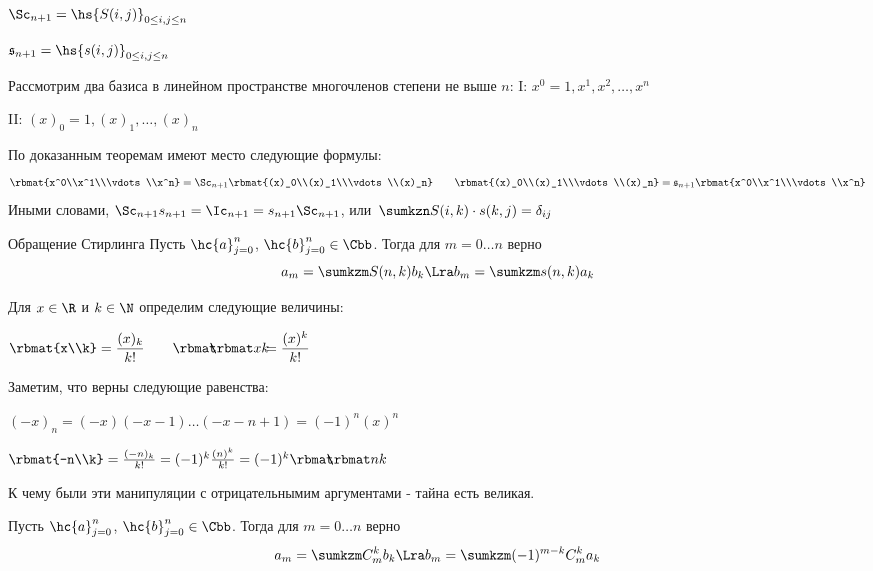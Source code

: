 \documentclass[unicode,10pt]{article}
\begin{document}
\begin{denote}
  $\displaystyle \Sc_{n+1}=\hs{S(i,j)}_{0\le i,j \le n}$\par
  $\mathfrak{s}_{n+1} = \hs{s(i,j)}_{0\le i,j \le n}$
\end{denote}
Рассмотрим два базиса в линейном пространстве многочленов степени не выше $n$:
I: $\displaystyle x^0=1, x^1, x^2, \dots, x^n$ \par
II: $\displaystyle (x)_0=1, (x)_1,\dots, (x)_n$ \par
По доказанным теоремам имеют место следующие формулы:
\begin{displaymath}
  \rbmat{x^0\\x^1\\\vdots\\x^n} = \Sc_{n+1}\rbmat{(x)_0\\(x)_1\\\vdots\\(x)_n}\qquad
  \rbmat{(x)_0\\(x)_1\\\vdots\\(x)_n} = \mathfrak{s}_{n+1}\rbmat{x^0\\x^1\\\vdots\\x^n}
\end{displaymath}
Иными словами, $\displaystyle \Sc_{n+1}s_{n+1} = \Ic_{n+1} = s_{n+1}\Sc_{n+1}$, или\
$\displaystyle \sumkzn S(i,k)\cdot s(k,j) = \delta_{ij}$
\begin{lemma}{Обращение Стирлинга}
  Пусть $\hc{a}_{j=0}^n$, $\hc{b}_{j=0}^n \in \Cbb$. Тогда для \linebreak $m=0\dots n$ верно
  \begin{displaymath}
    a_m=\sumkzm S(n,k)b_k \Lra b_m=\sumkzm s(n,k)a_k
  \end{displaymath}
\end{lemma}
\begin{denote}
  Для $x\in\R$ и $k\in\N$ определим следующие величины:\par
  $\displaystyle \rbmat{x\\k} = \frac{(x)_k}{k!}\qquad \cnka{x}{k}=\frac{(x)^k}{k!}$
\end{denote}
Заметим, что верны следующие равенства:\par
$\displaystyle (-x)_n=(-x)(-x-1)\dots (-x-n+1) = (-1)^n(x)^n$\par
$\rbmat{-n\\k} = \frac{(-n)_k}{k!}=(-1)^k\frac{(n)^k}{k!}=(-1)^k\cnka{n}{k}$
\begin{authornote}
  К чему были эти манипуляции с отрицательнымим аргументами - тайна есть великая.
\end{authornote}
\begin{problem}
  Пусть $\hc{a}_{j=0}^n$, $\hc{b}_{j=0}^n \in \Cbb$. Тогда для $m=0\dots n$ верно
  \begin{displaymath}
    a_m=\sumkzm C_m^kb_k \Lra b_m=\sumkzm (-1)^{m-k}C_m^ka_k
  \end{displaymath}
\end{problem}
\end{document}
